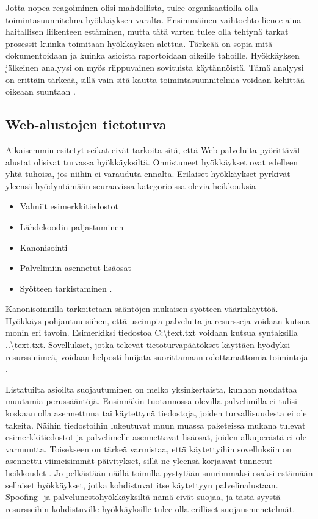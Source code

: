 Jotta nopea reagoiminen olisi mahdollista, tulee organisaatiolla olla
toimintasuunnitelma hyökkäyksen varalta. Ensimmäinen vaihtoehto lienee aina
haitallisen liikenteen estäminen, mutta tätä varten tulee olla tehtynä tarkat
prosessit kuinka toimitaan hyökkäyksen alettua. Tärkeää on sopia mitä
dokumentoidaan ja kuinka asioista raportoidaan oikeille tahoille. Hyökkäyksen
jälkeinen analyysi on myös riippuvainen sovituista käytännöistä. Tämä analyysi
on erittäin tärkeää, sillä vain sitä kautta toimintasuunnitelmia voidaan
kehittää oikeaan suuntaan \cite{DDOS}.

\subsection{Web-alustojen tietoturva}

Aikaisemmin esitetyt seikat eivät tarkoita sitä, että Web-palveluita pyörittävät alustat olisivat
turvassa hyökkäyksiltä. Onnistuneet hyökkäykset ovat edelleen yhtä tuhoisa, jos niihin ei varauduta ennalta.
Erilaiset hyökkäykset pyrkivät yleensä hyödyntämään seuraavissa kategorioissa olevia heikkouksia

\begin{itemize}
\item Valmiit esimerkkitiedostot
\item Lähdekoodin paljastuminen
\item Kanonisointi
\item Palvelimiin asennetut lisäosat
\item Syötteen tarkistaminen \cite{Hacking}.
\end{itemize}
Kanonisoinnilla tarkoitetaan sääntöjen mukaisen syötteen väärinkäyttöä. Hyökkäys pohjautuu siihen,
että useimpia palveluita ja resursseja voidaan kutsua monin eri tavoin. Esimerkiksi tiedostoa C:\textbackslash text.txt voidaan 
kutsua syntaksilla ..\textbackslash text.txt. Sovellukset, jotka tekevät tietoturvapäätökset käyttäen hyödyksi resurssinimeä,
voidaan helposti huijata suorittamaan odottamattomia toimintoja \cite{Hacking}.

Listatuilta asioilta suojautuminen on melko yksinkertaista, kunhan noudattaa muutamia perussääntöjä. Ensinnäkin tuotannossa 
olevilla palvelimilla ei tulisi koskaan olla asennettuna tai käytettynä tiedostoja, joiden turvallisuudesta ei ole
takeita. Näihin tiedostoihin lukeutuvat muun muassa paketeissa mukana tulevat esimerkkitiedostot ja palvelimelle asennettavat 
lisäosat, joiden alkuperästä ei ole varmuutta. Toisekseen on tärkeä varmistaa, että käytettyihin sovelluksiin
on asennettu viimeisimmät päivitykset, sillä ne yleensä korjaavat tunnetut heikkoudet \cite{Hacking}. Jo pelkästään näillä 
toimilla pystytään suurimmaksi osaksi estämään sellaiset hyökkäykset, jotka kohdistuvat itse käytettyyn palvelinalustaan.
Spoofing- ja palvelunestohyökkäyksiltä nämä eivät suojaa, ja tästä syystä resursseihin kohdistuville hyökkäyksille
tulee olla erilliset suojausmenetelmät.

